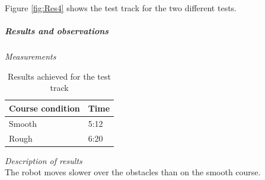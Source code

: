 Figure \ref{fig:Res4} shows the test track for the two different tests.
\subparagraph{Results and observations}
\textit{Measurements}\\
\begin{table}[H]
\centering
\begin{tabular}{|l|l|}
\hline
\textbf{Course condition}&\textbf{Time}\\\hline
Smooth&5:12\\\hline
Rough & 6:20\\
\hline
\end{tabular}
\caption{Results achieved for the test track}
\label{my-label}
\end{table}
\textit{Description of results}\\
The robot moves slower over the obstacles than on the smooth course.

